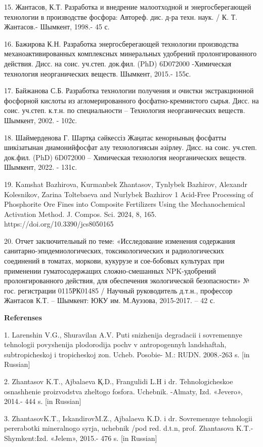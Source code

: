 15. Жантасов, К.Т. Разработка и внедрение малоотходной и
энергосберегающей технологии в производстве фосфора: Автореф. дис. д-ра
техн. наук. / К. Т. Жантасов.- Шымкент, 1998.- 45 с.

16. Бажирова К.Н. Разработка энергосберегающей технологии производства
механоактивированных комплексных минеральных удобрений пролонгированного
действия. Дисс. на соис. уч.степ. док.фил. (PhD) 6D072000 -Химическая
технология неорганических веществ. Шымкент, 2015.- 155с.

17. Байжанова С.Б. Разработка технологии получения и очистки
экстракционной фосфорной кислоты из агломерированного
фосфатно-кремнистого сырья. Дисс. на соис. уч.степ. к.т.н. по
специальности -- Технология неорганических веществ. Шымкент, 2002. -
102с.

18. Шаймерденова Г. Шартқа сәйкессіз Жаңатас кенорнының фосфатты
шикізатынан диамонийфосфат алу технологиясын әзірлеу. Дисс. на соис.
уч.степ. док.фил. (PhD) 6D072000 -- Химическая технология неорганических
веществ. Шымкент, 2022. - 131с.

19. Kamshat Bazhirova, Kurmanbek Zhantasov, Tynlybek Bazhirov, Alexandr
Kolesnikov, Zarina Toltebaeva and Nurlybek Bazhirov 1 Acid-Free
Processing of Phosphorite Ore Fines into Composite Fertilizers Using the
Mechanochemical Activation Method. J. Compos. Sci. 2024, 8, 165.
https://doi.org/10.3390/jcs8050165

20. Отчет заключительный по теме: «Исследование изменения содержания
санитарно-эпидемиологических, токсикологических и радиологических
соединений в томатах, моркови, кукурузе и сое-бобовых культурах при
применении гуматосодержащих сложно-смешанных NPK-удобрений
пролонгированного действия, для обеспечения экологической безопасности»
№ гос. регистрации 0115РК01485 / Научный руководитель д.т.н., профессор
Жантасов К.Т. -- Шымкент: ЮКУ им. М.Ауэзова, 2015-2017. -- 42 с.

\textbf{Referenses}

1. Larenshin V.G., Shuravilan A.V. Puti snizhenija degradacii i
sovremennye tehnologii povyshenija plodorodija pochv v antropogennyh
landshaftah, subtropicheskoj i tropicheskoj zon. Ucheb. Posobie- M.:
RUDN. 2008.-263 s. {[}in Russian{]}

2. Zhantasov K.T., Ajbalaeva Қ.D., Frangulidi L.H i dr. Tehnologicheskoe
osnashhenie proizvodstva zheltogo fosfora. Uchebnik. -Almaty, Izd.
«Jevero», 2014.- 444 s. {[}in Russian{]}

3. ZhantasovK.T., IskandirovM.Z., Ajbalaeva K.D. i dr. Sovremennye
tehnologii pererabotki mineral\textquotesingle nogo
syr\textquotesingle ja, uchebnik /pod red. d.t.n, prof. Zhantasova
K.T.-Shymkent:Izd. «Jelem», 2015.- 476 s. {[}in Russian{]}

